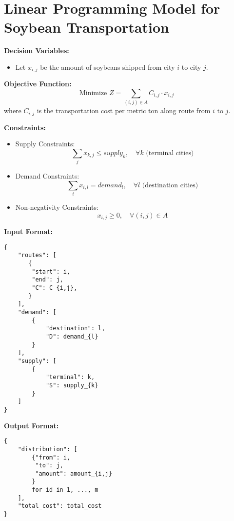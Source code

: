 \documentclass{article}
\begin{document}
\section*{Linear Programming Model for Soybean Transportation}

\textbf{Decision Variables:}
\begin{itemize}
    \item Let \( x_{i,j} \) be the amount of soybeans shipped from city \( i \) to city \( j \).
\end{itemize}

\textbf{Objective Function:}
\[
\text{Minimize } Z = \sum_{(i,j) \in A} C_{i,j} \cdot x_{i,j}
\]
where \( C_{i,j} \) is the transportation cost per metric ton along route from \( i \) to \( j \).

\textbf{Constraints:}

\begin{itemize}
    \item Supply Constraints:
    \[
    \sum_{j} x_{k,j} \leq supply_{k}, \quad \forall k \text{ (terminal cities)}
    \]
    
    \item Demand Constraints:
    \[
    \sum_{i} x_{i,l} = demand_{l}, \quad \forall l \text{ (destination cities)}
    \]
    
    \item Non-negativity Constraints:
    \[
    x_{i,j} \geq 0, \quad \forall (i,j) \in A
    \]
\end{itemize}

\textbf{Input Format:}
\begin{verbatim}
{
    "routes": [
       {
        "start": i,
        "end": j,
        "C": C_{i,j},
       }
    ],
    "demand": [
        {
            "destination": l,
            "D": demand_{l}
        }
    ],
    "supply": [
        {
            "terminal": k,
            "S": supply_{k}
        }
    ]
}
\end{verbatim}

\textbf{Output Format:}
\begin{verbatim}
{
    "distribution": [
        {"from": i,
         "to": j,
         "amount": amount_{i,j}
        }
        for id in 1, ..., m
    ],
    "total_cost": total_cost
}
\end{verbatim}
\end{document}
